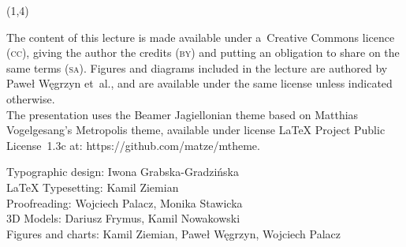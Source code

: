 {\begin{frame}[standout]
\begin{textblock}{4.2}
    \end{textblock}





    \begin{textblock}{11}(1,4)

      \begin{flushleft}

        \mdseries

        \footnotesize

        \RaggedRight

        \color{jFrametitleFGColor}

        The content of this lecture is made available under a~Creative
        Commons licence (\textsc{cc}), giving the author the credits
        (\textsc{by}) and putting an obligation to share on the same terms
        (\textsc{sa}). Figures and diagrams included in the lecture are
        authored by Paweł Węgrzyn et~al., and are available under the same
        license unless indicated otherwise.\\ The presentation uses the
        Beamer Jagiellonian theme based on Matthias Vogelgesang’s
        Metropolis theme, available under license \LaTeX{} Project
        Public License~1.3c at: 
        {https://github.com/matze/mtheme}.

        Typographic design: Iwona Grabska-Gradzińska \\
        \LaTeX{} Typesetting: Kamil Ziemian \\
        Proofreading: Wojciech Palacz,
        Monika Stawicka \\
        3D Models: Dariusz Frymus, Kamil Nowakowski \\
        Figures and charts: Kamil Ziemian, Paweł Węgrzyn, Wojciech Palacz

      \end{flushleft}

    \end{textblock}

  \end{frame}
}



